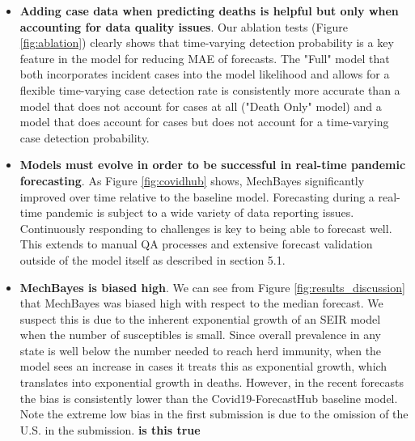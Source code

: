 \documentclass[11pt]{amsart}
\begin{document}
\begin{itemize}
\item \textbf{Adding case data when predicting deaths is helpful but only when accounting for data quality issues}. Our ablation tests (Figure \ref{fig:ablation}) clearly shows that time-varying detection probability is a key feature in the model for reducing MAE of forecasts. The "Full" model that both incorporates incident cases into the model likelihood and allows for a flexible time-varying case detection rate is consistently more accurate than a model that does not account for cases at all ("Death Only" model) and a model that does account for cases but does not account for a time-varying case detection probability.



\item \textbf{Models must evolve in order to be successful in real-time pandemic forecasting}. As Figure \ref{fig:covidhub} shows, MechBayes significantly improved over time relative to the baseline model. Forecasting during a real-time pandemic is subject to a wide variety of data reporting issues. Continuously responding to challenges is key to being able to forecast well. This extends to manual QA processes and extensive forecast validation outside of the model itself as described in section 5.1. 

\item \textbf{MechBayes is biased high}. We can see from Figure \ref{fig:results_discussion} that MechBayes was biased high with respect to the median forecast. We suspect this is due to the inherent exponential growth of an SEIR model when the number of susceptibles is small. Since overall prevalence in any state is well below the number needed to reach herd immunity, when the model sees an increase in cases it treats this as exponential growth, which translates into exponential growth in deaths. However, in the recent forecasts the bias is consistently lower than the Covid19-ForecastHub baseline model. Note the extreme low bias in the first submission is due to the omission of the U.S. in the submission. \textbf{is this true} 


\end{itemize}
\end{document}
